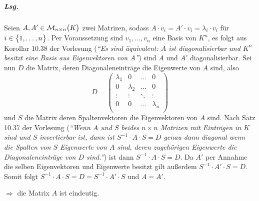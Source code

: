 \documentclass{scrreprt}
\begin{document}
\subparagraph{Lsg.} Seien $A, A' \in \mathcal{M}_{n \times n}\qty\big(K)$ zwei
Matrizen, sodass $A \cdot v_i = A' \cdot v_i = \lambda_i \cdot v_i$ für
$i \in \qty\big{1, \ldots, n}$.
Per Voraussetzung sind $v_1, \ldots, v_n$ eine Basis von $K^n$, es folgt aus
Korollar 10.38 der Vorlesung (\emph{``Es sind äquivalent: $A$ ist
  diagonalisierbar und $K^n$ besitzt eine Basis aus Eigenvektoren von $A$''})
sind $A$ und $A'$ diagonalisierbar.
Sei nun $D$ die Matrix, deren Diagonaleneinträge die Eigenwerte von $A$ sind,
also
\[
  D = \begin{pmatrix}
    \lambda_1 & 0 & \ldots & 0 \\
    0 & \lambda_2 & \ldots & 0 \\
    \vdots & \vdots & \ddots & \vdots \\
    0 & 0 & \ldots & \lambda_n \\
  \end{pmatrix}
\]
und $S$ die Matrix deren Spaltenvektoren die Eigenvektoren von $A$
sind.
Nach Satz 10.37 der Vorlesung (\emph{``Wenn $A$ und $S$ beides $n \times n$
  Matrizen mit Einträgen in $K$ sind und $S$ invertierbar ist, dann ist
  $S^{-1} \cdot A \cdot S = D$ genau dann diagonal wenn die Spalten von $S$
  Eigenwerte von $A$ sind, deren zugehörigen Eigenwerte die Diagonaleneinträge
  von $D$ sind.''})
ist dann $S^{-1} \cdot A \cdot S = D$.
Da $A'$ per Annahme die selben Eigenvektoren und Eigenwerte besitzt gilt
außerdem $S^{-1} \cdot A' \cdot S = D$.
Somit folgt $S^{-1} \cdot A \cdot S = D = S^{-1} \cdot A' \cdot S$ und $A = A'$.

\noindent
$\Rightarrow$ die Matrix $A$ ist eindeutig.
\end{document}
